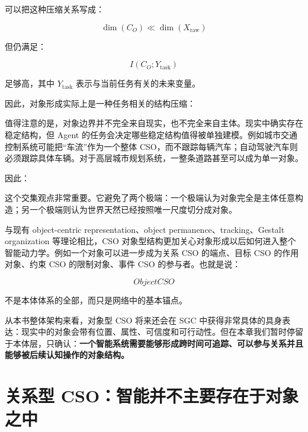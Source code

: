 可以把这种压缩关系写成：

\[
\boxed{
\dim(C_O)
\ll
\dim(X_{\mathrm{raw}})
}
\]

但仍满足：

\[
I(C_O;Y_{\mathrm{task}})
\]

足够高，其中 \(Y_{\mathrm{task}}\) 表示与当前任务有关的未来变量。

因此，对象形成实际上是一种任务相关的结构压缩：

\begin{statementbox}
\centering
{}
\end{statementbox}

值得注意的是，对象边界并不完全来自现实，也不完全来自主体。现实中确实存在稳定结构，但 Agent 的任务会决定哪些稳定结构值得被单独建模。例如城市交通控制系统可能把“车流”作为一个整体 CSO，而不跟踪每辆汽车；自动驾驶汽车则必须跟踪具体车辆。对于高层城市规划系统，一整条道路甚至可以成为单一对象。

因此：

\begin{statementbox}
\centering
{}
\end{statementbox}

这个交集观点非常重要。它避免了两个极端：一个极端认为对象完全是主体任意构造；另一个极端则认为世界天然已经按照唯一尺度切分成对象。

与现有 object-centric representation、object permanence、tracking、Gestalt organization 等理论相比，CSO 对象型结构更加关心对象形成以后如何进入整个智能动力学。例如一个对象可以进一步成为关系 CSO 的端点、目标 CSO 的作用对象、约束 CSO 的限制对象、事件 CSO 的参与者。也就是说：

\[
ObjectCSO
\]

不是本体体系的全部，而只是网络中的基本锚点。

从本书整体架构来看，对象型 CSO 将来还会在 SGC 中获得非常具体的具身表达：现实中的对象会带有位置、属性、可信度和可行动性。但在本章我们暂时停留于本体层，只确认：\textbf{一个智能系统需要能够形成跨时间可追踪、可以参与关系并且能够被后续认知操作的对象结构。}


\section{关系型 CSO：智能并不主要存在于对象之中}

